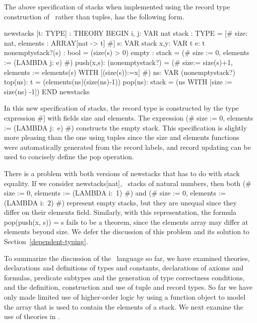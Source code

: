 The above specification of stacks when implemented using the record type
construction of \pvs\ rather than tuples, has the following form.
\begin{pvsexample}
  newstacks [t: TYPE] : THEORY 
   BEGIN
    i, j: VAR nat
    stack : TYPE = [# size: nat, elements : ARRAY[nat -> t] #]
    s: VAR stack
    x,y: VAR t
    e: t
    nonemptystack?(s) : bool = (size(s) > 0)
    empty : stack = (# size := 0, elements := (LAMBDA j: e) #)
    push(x,s): (nonemptystack?) =
       (# size:= size(s)+1,
          elements := elements(s) WITH [(size(s)):=x] #)
    ns: VAR (nonemptystack?)
    top(ns): t = (elements(ns)(size(ns)-1))
    pop(ns): stack = (ns WITH [size := size(ns) -1])
   END newstacks 
\end{pvsexample}
%
In this new specification of stacks, the record type is constructed by
the type expression {\stt [\# size:\ nat, elements :\ ARRAY[nat -> t] \#]}
with fields {\stt size} and {\stt elements}.  The expression {\stt (\#
size := 0, elements := (LAMBDA j:\ e) \#)} constructs the empty stack.
This specification is slightly more pleasing than the one using tuples
since the {\stt size} and {\stt elements} functions were automatically
generated from the record labels, and record updating can be used to
concisely define the {\stt pop} operation.

There is a problem with both versions of {\stt newstacks}  that
has to do with stack equality.  If we consider {\stt newstacks[nat]},
\ie\ stacks of natural numbers, then both
{\stt (\# size := 0, elements := (LAMBDA i:\ 1) \#)} and
{\stt (\# size := 0, elements := (LAMBDA i:\ 2) \#)} represent
empty stacks, but they are unequal since they differ on
their elements field.  Similarly, with this representation,
the formula {\stt pop(push(x, s)) = s} fails to be a theorem, since the
{\stt elements} array may differ at elements beyond {\stt size}.
We defer the discussion of this problem
and its solution to Section~\ref{dependent-typing}.

To summarize the discussion of the \pvs\ language so far, we have
examined theories, declarations and definitions of types and
constants, declarations of axioms and formulas, predicate subtypes and
the generation of type correctness conditions, and the definition,
construction and use of tuple and record types.  So far we have only
made limited use of higher-order logic by using a function object to
model the array that is used to contain the elements of a stack.  We
next examine the use of theories in \pvs\@.


